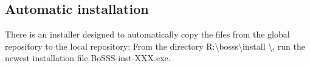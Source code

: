 \documentclass[11pt,twoside,a4paper]{fdyartcl}
\begin{document}
\subsection{Automatic installation}
There is an installer designed to automatically copy the files from the global repository to the local repository: %
From the directory {\scriptsize R:\textbackslash bosss\textbackslash install \textbackslash }, run the newest installation file {\scriptsize BoSSS-inst-XXX.exe}.\\
\end{document}
